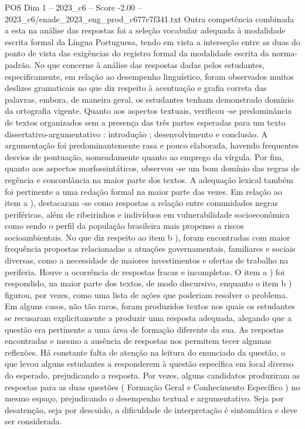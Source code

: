 \begin{textsample}{POS Dim 1 – 2023\_c6 – Score -2.00 – 2023\_c6/enade\_2023\_eng\_prod\_c677c7f341.txt}
Outra competência combinada a esta na análise das respostas foi a seleção vocabular adequada à modalidade escrita formal da Língua Portuguesa, tendo em vista a interseção entre as duas do ponto de vista das exigências do registro formal da modalidade escrita da norma-padrão.
No que concerne à análise das respostas dadas pelos estudantes, especificamente, em relação ao desempenho linguístico, foram observados muitos deslizes gramaticais no que diz respeito à acentuação e grafia correta das palavras, embora, de maneira geral, os estudantes tenham demonstrado domínio da ortografia vigente.
Quanto aos aspectos textuais, verificou -se predominância de textos organizados sem a presença das três partes esperadas para um texto dissertativo-argumentativo : introdução ; desenvolvimento e conclusão.
A argumentação foi predominantemente rasa e pouco elaborada, havendo frequentes desvios de pontuação, nomeadamente quanto ao emprego da vírgula.
Por fim, quanto aos aspectos morfossintáticos, observou -se um bom domínio das regras de regência e concordância na maior parte dos textos.
A adequação lexical também foi pertinente a uma redação formal na maior parte das vezes.
Em relação ao item a ), destacaram -se como respostas a relação entre comunidades negras periféricas, além de ribeirinhos e indivíduos em vulnerabilidade socioeconômica como sendo o perfil da população brasileira mais propenso a riscos socioambientais.
No que diz respeito ao item b ), foram encontradas com maior frequência propostas relacionadas a atuações governamentais, familiares e sociais diversas, como a necessidade de maiores investimentos e ofertas de trabalho na periferia.
Houve a ocorrência de respostas fracas e incompletas.
O item a ) foi respondido, na maior parte dos textos, de modo discursivo, enquanto o item b ) figurou, por vezes, como uma lista de ações que poderiam resolver o problema.
Em alguns casos, não tão raros, foram produzidos textos nos quais os estudantes se recusaram explicitamente a produzir uma resposta adequada, alegando que a questão era pertinente a uma área de formação diferente da sua.
As respostas encontradas e mesmo a ausência de respostas nos permitem tecer algumas reflexões.
Há constante falta de atenção na leitura do enunciado da questão, o que levou alguns estudantes a responderem à questão específica em local diverso do esperado, prejudicando a resposta.
Por vezes, alguns candidatos produziram as respostas para as duas questões ( Formação Geral e Conhecimento Específico ) no mesmo espaço, prejudicando o desempenho textual e argumentativo.
Seja por desatenção, seja por descuido, a dificuldade de interpretação é sintomática e deve ser considerada.

\end{textsample}
